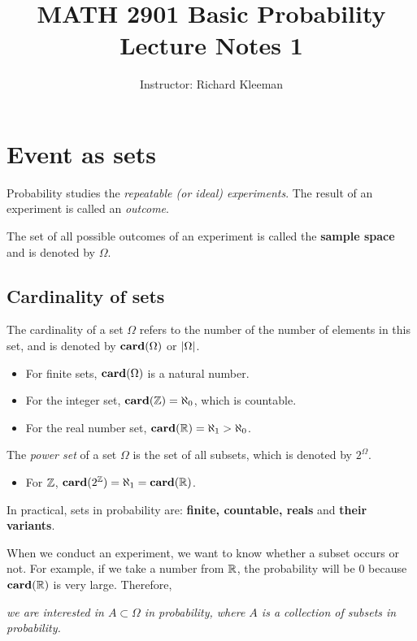 


\title{MATH 2901 Basic Probability Lecture Notes 1}
\author{Instructor: Richard Kleeman}
\date{}
\maketitle


\section{Event as sets}
Probability studies the \emph{repeatable (or ideal) experiments}. The result of an experiment is called an \emph{outcome}.

\begin{definition}
The set of all possible outcomes of an experiment is called the \textbf{sample space} and is denoted by $\Omega$.  
\end{definition}

\subsection{Cardinality of sets}
The cardinality of a set $\Omega$ refers to the number of the number of elements in this set, and is denoted by $\mathbf{card}(\Omega)$ or $\left\vert \Omega \right\vert$.
\begin{itemize}
    \item For finite sets, $\mathbf{card}(\Omega)$ is a natural number.
    \item For the integer set, $\mathbf{card}(\mathbb{Z}) = \aleph_0$, which is countable.
    \item For the real number set, $\mathbf{card}(\mathbb{R}) = \aleph_1 > \aleph_0$.
\end{itemize}
The \emph{power set} of a set $\Omega$ is the set of all subsets, which is denoted by $2^\Omega$.
\begin{itemize}
    \item For $\mathbb{Z}$, $\mathbf{card}(2^{\mathbb{Z}}) = \aleph_1 = \mathbf{card}(\mathbb{R})$.
\end{itemize}

In practical, sets in probability are: \textbf{finite, countable, reals} and \textbf{their variants}.

When we conduct an experiment, we want to know whether a subset occurs or not. For example, if we take a number from $\mathbb{R}$, the probability will be 0 because $\mathbf{card}(\mathbb{R})$ is very large. Therefore,
\begin{center}
\emph{we are interested in $A \subset \Omega$ in probability, where $A$ is a collection of subsets in probability.}
\end{center}

